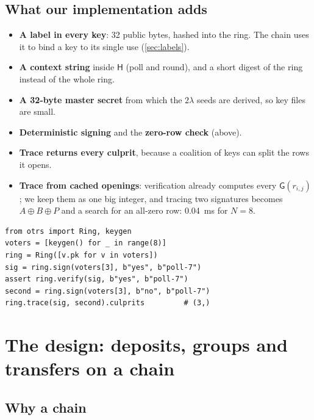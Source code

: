 \documentclass[11pt,a4paper]{article}
\newcommand{\Gf}{\mathsf{G}}
\newcommand{\Hf}{\mathsf{H}}
\theoremstyle{definition}
\begin{document}
\subsection{What our implementation adds}

\begin{itemize}[leftmargin=*]
\item \textbf{A label in every key}: 32 public bytes, hashed into the ring.
      The chain uses it to bind a key to its single use
      (\cref{sec:labels}).
\item \textbf{A context string} inside $\Hf$ (poll and round), and a
      short digest of the ring instead of the whole ring.
\item \textbf{A 32-byte master secret} from which the $2\lambda$ seeds are
      derived, so key files are small.
\item \textbf{Deterministic signing} and the \textbf{zero-row check} (above).
\item \textbf{Trace returns every culprit}, because a coalition of keys can
      split the rows it opens.
\item \textbf{Trace from cached openings}: verification already computes
      every $\Gf(r_{i,j})$; we keep them as one big integer, and tracing two
      signatures becomes $A \oplus B \oplus P$ and a search for an all-zero
      row: 0.04~ms for $N = 8$.
\end{itemize}

\begin{lstlisting}[style=py]
from otrs import Ring, keygen
voters = [keygen() for _ in range(8)]
ring = Ring([v.pk for v in voters])
sig = ring.sign(voters[3], b"yes", b"poll-7")
assert ring.verify(sig, b"yes", b"poll-7")
second = ring.sign(voters[3], b"no", b"poll-7")
ring.trace(sig, second).culprits         # (3,)
\end{lstlisting}

\section{The design: deposits, groups and transfers on a chain}
\label{sec:chain}

\subsection{Why a chain}
\end{document}
